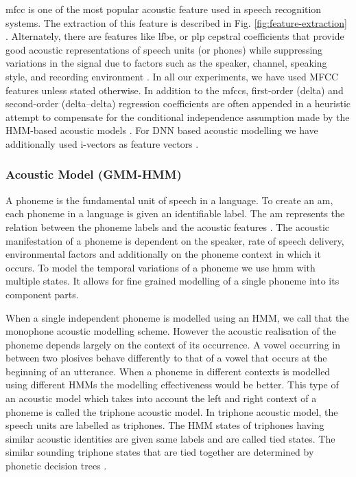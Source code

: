 \Gls{mfcc} is one of the most popular acoustic feature used in speech recognition systems. The extraction of this feature is described in Fig. \ref{fig:feature-extraction} \cite{georgescu2021performance}. Alternately, there are features like \gls{lfbe}, or \gls{plp} cepstral coefficients that provide good acoustic
representations of speech units (or phones) while suppressing variations in the
signal due to factors such as the speaker, channel, speaking style, and
recording environment \cite{madhavaraj2020strategies}. In all our experiments,
we have used MFCC features unless stated otherwise. In addition to the \gls{mfcc}s, first-order
(delta) and second-order (delta–delta) regression coefficients are often appended in a heuristic attempt to
compensate for the conditional independence assumption made by the HMM-based acoustic models \cite{benesty2008springer}. For DNN based acoustic
modelling we have additionally used i-vectors as feature vectors \cite{saon2013speaker}. 


\subsubsection{Acoustic Model (GMM-HMM)}

A phoneme is the fundamental unit of speech in a language. To create an \gls{am}, each phoneme in a 
language is given an identifiable label. The \gls{am} represents the
relation between the phoneme labels and the acoustic features
\cite{madhavaraj2020strategies}. The acoustic manifestation of a phoneme is
dependent on the speaker, rate of speech delivery, environmental factors and
additionally on the phoneme context in which it occurs. To model the temporal variations of a phoneme we use \gls{hmm} with
multiple states. It allows for fine grained modelling of a single phoneme into its component parts. 

When a single independent phoneme is modelled using an HMM, we call that the monophone acoustic modelling scheme. However the acoustic realisation of the
phoneme depends largely on the context of its occurrence. A vowel occurring in 
between two plosives behave differently to that of a vowel that occurs at the
beginning of an utterance. When a phoneme in different contexts is modelled using different HMMs the modelling effectiveness would be better. This type of an acoustic model which
takes into account the left and right context of a phoneme is called the
triphone acoustic model. In triphone acoustic model, the speech units are labelled as triphones. The HMM states of triphones having similar acoustic identities are given same labels and are called tied states. The similar sounding triphone states that are tied together are determined by phonetic decision trees \cite{young1994tree}.




